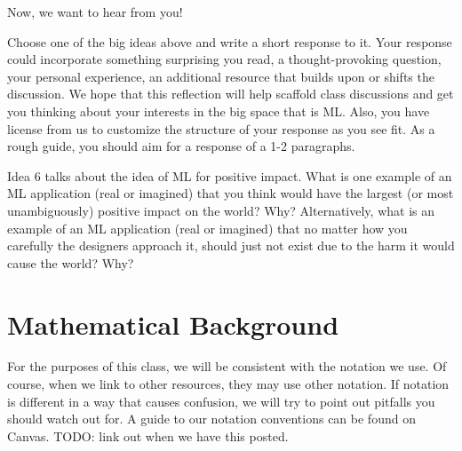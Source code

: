 \documentclass[assignment01_Solutions]{subfiles}
\begin{document}

\begin{exercise}
Now, we want to hear from you!  
\bes
\item Choose one of the big ideas above and write a short response to it.  Your response could incorporate something surprising you read, a thought-provoking question, your personal experience, an additional resource that builds upon or shifts the discussion.  We hope that this reflection will help scaffold class discussions and get you thinking about your interests in the big space that is ML.  Also, you have license from us to customize the structure of your response as you see fit.  As a rough guide, you should aim for a response of a 1-2 paragraphs.
\item Idea 6 talks about the idea of ML for positive impact.  What is one example of an ML application (real or imagined) that you think would have the largest (or most unambiguously) positive impact on the world?  Why?  Alternatively, what is an example of an ML application (real or imagined) that no matter how you carefully the designers approach it, should just not exist due to the harm it would cause the world?  Why?
\ees
\end{exercise}

\section{Mathematical Background}


\begin{notice}
For the purposes of this class, we will be consistent with the notation we use.  Of course, when we link to other resources, they may use other notation.  If notation is different in a way that causes confusion, we will try to point out pitfalls you should watch out for.  A guide to our notation conventions can be found on Canvas.  TODO: link out when we have this posted.
\end{notice}
\end{document}

